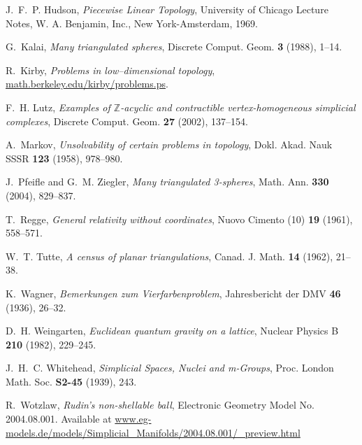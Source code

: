 \documentclass[a4paper,11pt]{article}
\theoremstyle{plain}
\theoremstyle{definition}
\begin{document}
{\begin{thebibliography}{AL{\L}M13}
J.~F.~P. Hudson, \emph{Piecewise {L}inear {T}opology}, University of Chicago
  Lecture Notes, W. A. Benjamin, Inc., New York-Amsterdam, 1969.


G.~Kalai, \emph{Many triangulated spheres}, Discrete Comput. Geom. \textbf{3}
  (1988), 1--14.

R.~Kirby, \emph{Problems in low--dimensional topology},
  \href{http://math.berkeley.edu/~kirby/problems.ps.gz}{math.berkeley.edu/kirby/problems.ps}.


F.~H. Lutz, \emph{Examples of {$\mathbb{Z}$}-acyclic and contractible
  vertex-homogeneous simplicial complexes}, Discrete Comput. Geom. \textbf{27}
  (2002), 137--154.

A.~Markov, \emph{Unsolvability of certain problems in topology}, Dokl. Akad.
  Nauk SSSR \textbf{123} (1958), 978--980.



J.~Pfeifle and G.~M. Ziegler, \emph{Many triangulated 3-spheres}, Math. Ann.
  \textbf{330} (2004), 829--837.


T.~Regge, \emph{General relativity without coordinates}, Nuovo Cimento (10)
  \textbf{19} (1961), 558--571.


W.~T. Tutte, \emph{A census of planar triangulations}, Canad. J. Math.
  \textbf{14} (1962), 21--38.


%
K.~Wagner, \emph{Bemerkungen zum {V}ierfarbenproblem}, Jahresbericht der DMV
  \textbf{46} (1936), 26--32.

D.~H. Weingarten, \emph{Euclidean quantum gravity on a lattice}, Nuclear
  Physics B \textbf{210} (1982), 229--245.


J.~H.~C. Whitehead,  \emph{Simplicial {S}paces, {N}uclei and m-{G}roups}, Proc. London
  Math. Soc. \textbf{S2-45} (1939), 243.

R.~Wotzlaw,  \emph{Rudin's non-shellable ball}, Electronic Geometry Model No. 2004.08.001. Available at 
\url{www.eg-models.de/models/Simplicial_Manifolds/2004.08.001/_preview.html}


\end{thebibliography}
}
\end{document}
